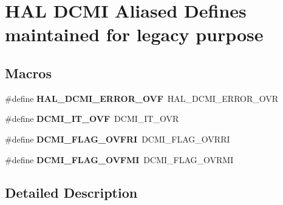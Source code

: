\hypertarget{group___h_a_l___d_c_m_i___aliased___defines}{\section{H\-A\-L D\-C\-M\-I Aliased Defines maintained for legacy purpose}
\label{group___h_a_l___d_c_m_i___aliased___defines}
}
\subsection*{Macros}
\begin{DoxyCompactItemize}
\item 
\hypertarget{group___h_a_l___d_c_m_i___aliased___defines_ga5aea0676cf18867facb28620b5818396}{\#define {\bfseries H\-A\-L\-\_\-\-D\-C\-M\-I\-\_\-\-E\-R\-R\-O\-R\-\_\-\-O\-V\-F}~H\-A\-L\-\_\-\-D\-C\-M\-I\-\_\-\-E\-R\-R\-O\-R\-\_\-\-O\-V\-R}\label{group___h_a_l___d_c_m_i___aliased___defines_ga5aea0676cf18867facb28620b5818396}

\item 
\hypertarget{group___h_a_l___d_c_m_i___aliased___defines_ga5afbb2e1a8b64d9e042da18d8304667e}{\#define {\bfseries D\-C\-M\-I\-\_\-\-I\-T\-\_\-\-O\-V\-F}~D\-C\-M\-I\-\_\-\-I\-T\-\_\-\-O\-V\-R}\label{group___h_a_l___d_c_m_i___aliased___defines_ga5afbb2e1a8b64d9e042da18d8304667e}

\item 
\hypertarget{group___h_a_l___d_c_m_i___aliased___defines_ga10e986f24ca3e73d31f56ddd908987e0}{\#define {\bfseries D\-C\-M\-I\-\_\-\-F\-L\-A\-G\-\_\-\-O\-V\-F\-R\-I}~D\-C\-M\-I\-\_\-\-F\-L\-A\-G\-\_\-\-O\-V\-R\-R\-I}\label{group___h_a_l___d_c_m_i___aliased___defines_ga10e986f24ca3e73d31f56ddd908987e0}

\item 
\hypertarget{group___h_a_l___d_c_m_i___aliased___defines_gaec0c82ddcc3994b877a2f904c680e2b1}{\#define {\bfseries D\-C\-M\-I\-\_\-\-F\-L\-A\-G\-\_\-\-O\-V\-F\-M\-I}~D\-C\-M\-I\-\_\-\-F\-L\-A\-G\-\_\-\-O\-V\-R\-M\-I}\label{group___h_a_l___d_c_m_i___aliased___defines_gaec0c82ddcc3994b877a2f904c680e2b1}

\end{DoxyCompactItemize}


\subsection{Detailed Description}
